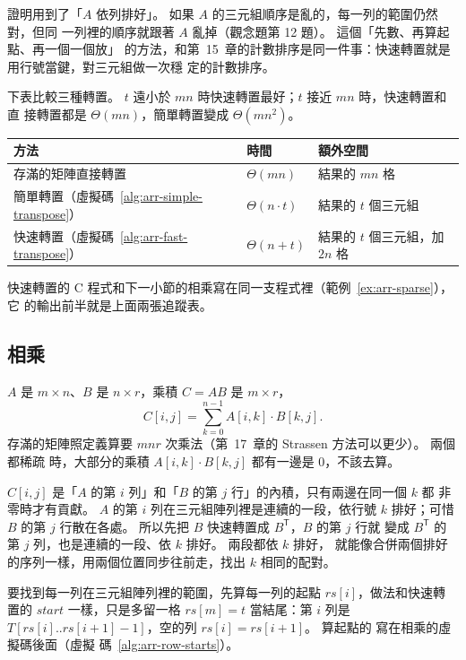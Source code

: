 證明用到了「$A$ 依列排好」。 如果 $A$ 的三元組順序是亂的，每一列的範圍仍然對，但同
一列裡的順序就跟著 $A$ 亂掉（觀念題第 12 題）。 這個「先數、再算起點、再一個一個放」
的方法，和第~15~章的計數排序是同一件事：快速轉置就是用行號當鍵，對三元組做一次穩
定的計數排序。

下表比較三種轉置。 $t$ 遠小於 $mn$ 時快速轉置最好；$t$ 接近 $mn$ 時，快速轉置和直
接轉置都是 $\Theta(mn)$，簡單轉置變成 $\Theta(mn^2)$。

\begin{center}
\begin{tabular}{lll}
\toprule
方法 & 時間 & 額外空間 \\
\midrule
存滿的矩陣直接轉置 & $\Theta(mn)$ & 結果的 $mn$ 格 \\
簡單轉置（虛擬碼~\ref{alg:arr-simple-transpose}）& $\Theta(n \cdot t)$ & 結果的 $t$ 個三元組 \\
快速轉置（虛擬碼~\ref{alg:arr-fast-transpose}）& $\Theta(n + t)$ & 結果的 $t$ 個三元組，加 $2n$ 格 \\
\bottomrule
\end{tabular}
\end{center}

快速轉置的 C 程式和下一小節的相乘寫在同一支程式裡（範例~\ref{ex:arr-sparse}），它
的輸出前半就是上面兩張追蹤表。

\subsection{相乘}

$A$ 是 $m \times n$、$B$ 是 $n \times r$，乘積 $C = AB$ 是 $m \times r$，
\[
C[i, j] = \sum_{k=0}^{n-1} A[i, k] \cdot B[k, j] .
\]
存滿的矩陣照定義算要 $mnr$ 次乘法（第~17~章的 Strassen 方法可以更少）。 兩個都稀疏
時，大部分的乘積 $A[i, k] \cdot B[k, j]$ 都有一邊是 $0$，不該去算。

$C[i, j]$ 是「$A$ 的第 $i$ 列」和「$B$ 的第 $j$ 行」的內積，只有兩邊在同一個 $k$ 都
非零時才有貢獻。 $A$ 的第 $i$ 列在三元組陣列裡是連續的一段，依行號 $k$ 排好；可惜
$B$ 的第 $j$ 行散在各處。 所以先把 $B$ 快速轉置成 $B^{\mathsf T}$，$B$ 的第 $j$ 行就
變成 $B^{\mathsf T}$ 的第 $j$ 列，也是連續的一段、依 $k$ 排好。 兩段都依 $k$ 排好，
就能像合併兩個排好的序列一樣，用兩個位置同步往前走，找出 $k$ 相同的配對。

要找到每一列在三元組陣列裡的範圍，先算每一列的起點 $\mathit{rs}[i]$，做法和快速轉
置的 $\mathit{start}$ 一樣，只是多留一格 $\mathit{rs}[m] = t$ 當結尾：第 $i$ 列是
$T[\mathit{rs}[i] .. \mathit{rs}[i + 1] - 1]$，空的列 $\mathit{rs}[i] =
\mathit{rs}[i + 1]$。 算起點的  寫在相乘的虛擬碼後面（虛擬
碼~\ref{alg:arr-row-starts}）。

